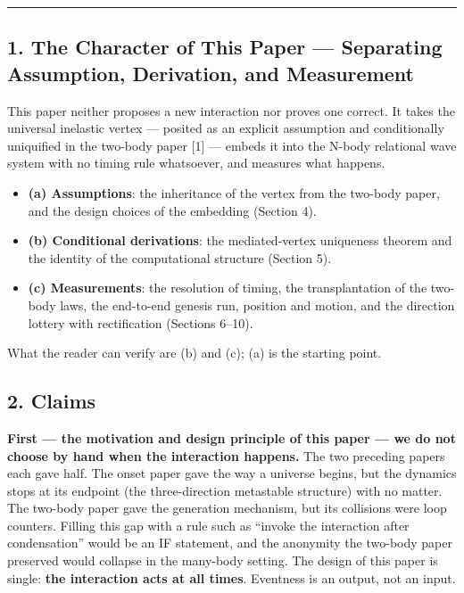 \documentclass[
  a4paper,
]{article}
\providecommand{\tightlist}{%
  \setlength{\itemsep}{0pt}\setlength{\parskip}{0pt}}
\begin{document}
\begin{center}\rule{0.5\linewidth}{0.5pt}\end{center}

\subsection{1. The Character of This Paper --- Separating Assumption,
Derivation, and
Measurement}\label{the-character-of-this-paper-separating-assumption-derivation-and-measurement}

This paper neither proposes a new interaction nor proves one correct. It
takes the universal inelastic vertex --- posited as an explicit
assumption and conditionally uniquified in the two-body paper {[}1{]}
--- embeds it into the N-body relational wave system with no timing rule
whatsoever, and measures what happens.

\begin{itemize}
\tightlist
\item
  \textbf{(a) Assumptions}: the inheritance of the vertex from the
  two-body paper, and the design choices of the embedding (Section 4).
\item
  \textbf{(b) Conditional derivations}: the mediated-vertex uniqueness
  theorem and the identity of the computational structure (Section 5).
\item
  \textbf{(c) Measurements}: the resolution of timing, the
  transplantation of the two-body laws, the end-to-end genesis run,
  position and motion, and the direction lottery with rectification
  (Sections 6--10).
\end{itemize}

What the reader can verify are (b) and (c); (a) is the starting point.

\subsection{2. Claims}\label{claims}

\textbf{First --- the motivation and design principle of this paper ---
we do not choose by hand when the interaction happens.} The two
preceding papers each gave half. The onset paper gave the way a universe
begins, but the dynamics stops at its endpoint (the three-direction
metastable structure) with no matter. The two-body paper gave the
generation mechanism, but its collisions were loop counters. Filling
this gap with a rule such as ``invoke the interaction after
condensation'' would be an IF statement, and the anonymity the two-body
paper preserved would collapse in the many-body setting. The design of
this paper is single: \textbf{the interaction acts at all times}.
Eventness is an output, not an input.
\end{document}
